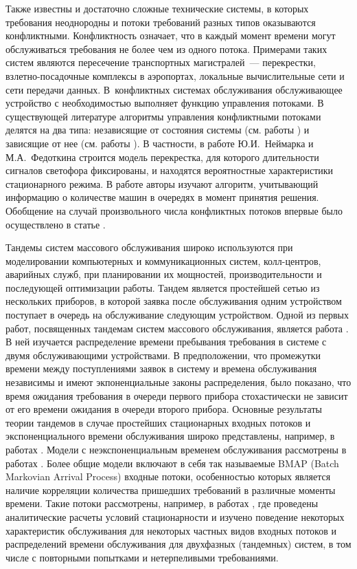 Также известны и достаточно сложные технические системы, в которых требования неоднородны и потоки требований разных типов оказываются конфликтными. Конфликтность означает, что в каждый момент времени могут обслуживаться требования не более чем из одного потока. Примерами таких систем являются пересечение транспортных магистралей~--- перекрестки, взлетно-посадочные комплексы в аэропортах, локальные вычислительные сети и сети передачи данных. В~конфликтных системах обслуживания обслуживающее устройство с необходимостью выполняет функцию управления потоками. В существующей литературе алгоритмы управления конфликтными потоками делятся на два типа: независящие от состояния системы (см. работы \cite{Darroch:1964,Holland:1, Holland:2, Holland:3, Holland:4, Neimark:1966}) и зависящие от нее  (см. работы \cite{Neimark:1968, Fedotkin:1976, Ferguson:1985, Takagi:1985}). В частности, в работе Ю.И.~Неймарка и М.А.~Федоткина \cite{Neimark:1966} строится модель перекрестка, для которого длительности сигналов светофора фиксированы, и находятся вероятностные характеристики стационарного режима. В работе \cite{Neimark:1968} авторы изучают алгоритм, учитывающий информацию о количестве машин в очередях в момент принятия решения. Обобщение на случай произвольного числа конфликтных потоков впервые было осуществлено в статье \cite{Yakushev:1990}.

 
  
Тандемы систем массового обслуживания широко используются при моделировании компьютерных и коммуникационных систем, колл-центров, аварийных служб, при планировании их мощностей, производительности и последующей оптимизации работы. 
Тандем является простейшей сетью из нескольких приборов, в которой заявка после обслуживания одним устройством  поступает в очередь на обслуживание следующим устройством.
Одной из первых работ, посвященных тандемам систем массового обслуживания, является работа \cite{reich}. В ней изучается распределение времени пребывания требования в системе с двумя обслуживающими устройствами. В предположении, что промежутки времени между поступлениями заявок в систему и времена обслуживания независимы и имеют экпоненциальные законы распределения, было показано, что время ожидания требования в очереди первого прибора стохастически не зависит от его времени ожидания в очереди второго прибора. Основные результаты теории тандемов в случае простейших стационарных входных потоков и экспоненциального времени обслуживания широко представлены, например, в работах \cite{Balsamo, GnedenkoKonig}. Модели с неэкспоненциальным временем обслуживания рассмотрены в работах \cite{Gomez:1,Gomez:2,Gomez:3}. Более общие модели включают в себя так называемые BMAP (Batch Markovian Arrival Process) входные потоки, особенностью которых является наличие корреляции количества пришедших требований в различные моменты времени. Такие потоки рассмотрены, например, в работах \cite{KlimenokDudin:2005,KlimenokDudin:2004,Klimenok:2010,Klimenok:2011,Klimenok:2015 }, где проведены аналитические расчеты условий стационарности и изучено поведение некоторых характеристик обслуживания для некоторых частных видов входных потоков и распределений времени обслуживания для двухфазных (тандемных) систем, в том числе с повторными попытками и нетерпеливыми требованиями.  

